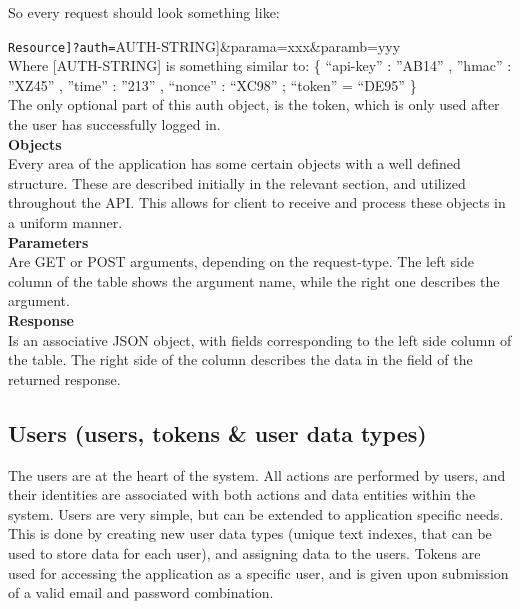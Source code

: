 \documentclass[11pt]{article}
\begin{document}
So every request should look something like: 

\verb[Resource]?auth=[AUTH-STRING]\&parama=xxx\&paramb=yyy \\

Where [AUTH-STRING] is something similar to:
\{ “api-key” : ”AB14” , ”hmac” : ”XZ45” , ”time” : ”213” , “nonce” : “XC98” ; “token” = “DE95” \} \\

The only optional part of this auth object, is the token, which is only used after the user has successfully logged in. \\

\textbf{Objects} \\
Every area of the application has some certain objects with a well defined structure. These are described initially in the relevant section, and utilized throughout the API. This allows for client to receive and process these objects in a uniform manner.\\

\textbf{Parameters} \\
Are GET or POST arguments, depending on the request-type. The left side column of the table shows the argument name, while the right one describes the argument. \\

\textbf{Response} \\
Is an associative JSON object, with fields corresponding to the left side column of the table. The right side of the column describes the data in the field of the returned response.

\subsection{Users (users, tokens \& user data types)}
\label{sec-1-2}

The users are at the heart of the system. All actions are performed by users, and their identities are associated with both actions and data entities within the system. Users are very simple, but can be extended to application specific needs. This is done by creating new user data types (unique text indexes, that can be used to store data for each user), and assigning data to the users. Tokens are used for accessing the application as a specific user, and is given upon submission of a valid email and password combination.
\end{document}

